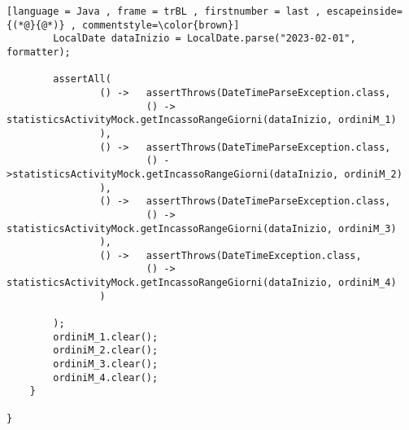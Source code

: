 \begin{lstlisting}[language = Java , frame = trBL , firstnumber = last , escapeinside={(*@}{@*)} , commentstyle=\color{brown}]
        LocalDate dataInizio = LocalDate.parse("2023-02-01", formatter);

        assertAll(
                () ->   assertThrows(DateTimeParseException.class,
                        () -> statisticsActivityMock.getIncassoRangeGiorni(dataInizio, ordiniM_1)
                ),
                () ->   assertThrows(DateTimeParseException.class,
                        () ->statisticsActivityMock.getIncassoRangeGiorni(dataInizio, ordiniM_2)
                ),
                () ->   assertThrows(DateTimeParseException.class,
                        () -> statisticsActivityMock.getIncassoRangeGiorni(dataInizio, ordiniM_3)
                ),
                () ->   assertThrows(DateTimeException.class,
                        () -> statisticsActivityMock.getIncassoRangeGiorni(dataInizio, ordiniM_4)
                )

        );
        ordiniM_1.clear();
        ordiniM_2.clear();
        ordiniM_3.clear();
        ordiniM_4.clear();
    }

}

\end{lstlisting}




